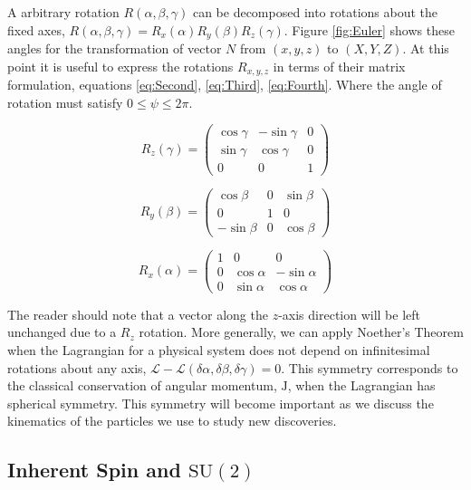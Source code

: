 A arbitrary rotation $R(\alpha, \beta, \gamma)$ can be decomposed into rotations about the fixed axes, $R(\alpha, \beta, \gamma) = R_{x}(\alpha)R_{y}(\beta)R_{z}(\gamma)$. Figure \ref{fig:Euler} shows these angles for the transformation of vector $N$ from $(x,y,z)$ to $(X,Y,Z)$. At this point it is useful to express the rotations $R_{x,y,z}$ in terms of their matrix formulation, equations \eqref{eq:Second}, \eqref{eq:Third}, \eqref{eq:Fourth}. Where the angle of rotation must satisfy $0 \leq \psi \leq 2\pi$.

\begin{equation}
\label{eq:Second}
R_{z}(\gamma) = \left( \begin{array}{ccc}
\cos\gamma & -\sin\gamma & 0 \\
\sin\gamma & \cos\gamma & 0 \\
0 & 0 & 1 \end{array} \right)
\end{equation}

\begin{equation}
\label{eq:Third}
R_{y}(\beta) = \left( \begin{array}{ccc}
\cos\beta & 0 & \sin\beta \\
0 & 1 & 0 \\
-\sin\beta & 0 & \cos\beta \end{array} \right)
\end{equation}

\begin{equation}
\label{eq:Fourth}
R_{x}(\alpha) = \left( \begin{array}{ccc}
1 & 0 & 0 \\
0 & \cos\alpha & -\sin\alpha \\
0 & \sin\alpha & \cos\alpha \end{array} \right) 
\end{equation}

The reader should note that a vector along the $z$-axis direction will be left unchanged due to a $R_{z}$ rotation. More generally, we can apply Noether's Theorem when the Lagrangian for a physical system does not depend on infinitesimal rotations about any axis, $\mathscr{L}-\mathscr{L}(\delta\alpha,\delta\beta,\delta\gamma) = 0$. This symmetry corresponds to the classical conservation of angular momentum, $\mathrm{J}$, when the Lagrangian has spherical symmetry. This symmetry will become important as we discuss the kinematics of the particles we use to study new discoveries.

\subsection{Inherent Spin and $\mathrm{SU}(2)$}
\label{sec:SU2}

